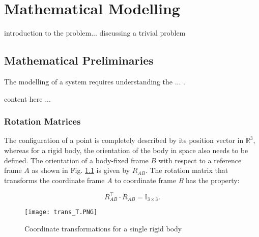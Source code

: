 
\chapter{Mathematical Modelling} %

\label{Chapter2} %


introduction to the problem... discussing a trivial problem    
\section{Mathematical Preliminaries}

The modelling of a system requires understanding the ... \citep{craig2009introduction}.  

content here ...
\newpage %

\subsection{Rotation Matrices}
The configuration of a point is completely described by its position vector in $\mathbb{R}^3$, whereas for a rigid body, the orientation of the body in space also needs to be defined.
The orientation of a body-fixed frame $B$ with respect to a reference frame $A$ as shown in Fig. \ref{fig:trans} is given by $R_{AB}$. The rotation matrix that transforms the coordinate frame \textit{A} to coordinate frame \textit{B} has the property:

\begin{equation}\label{eq:ortho}
R_{AB}^{\intercal}\cdot R_{AB} = \mathbb{I}_{3\times 3}.
\end{equation}

\begin{figure}[!htb]
    \centering
    \texttt{[image: trans\_T.PNG]}
    \caption{ Coordinate transformations for a single rigid body}
    \label{fig:trans}
\end{figure}

